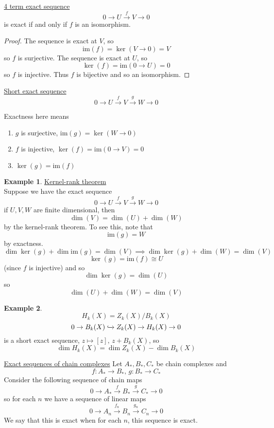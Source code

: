 \documentclass[a4paper,14pt]{extarticle}
\theoremstyle{definition}
\newtheorem*{eg}{Example}
\begin{document}
\noindent\underline{4 term exact sequence}
\[0\rightarrow U \xrightarrow{f} V\rightarrow 0\]
is exact if and only if $f$ is an isomorphism.

\begin{proof}
	The sequence is exact at $V$, so \[\text{im}(f)=\ker(V\rightarrow 0)=V\]
	so $f$ is surjective. The sequence is exact at $U$, so
	\[\ker(f)=\text{im}(0\rightarrow U)=0\] so $f$ is injective. Thus $f$ is bijective
	and so an isomorphism.
\end{proof}

\noindent\underline{Short exact sequence}
\[0\rightarrow U\xrightarrow{f} V\xrightarrow{g} W\rightarrow 0\]

Exactness here means
\begin{enumerate}
	\item $g$ is surjective, $\text{im}(g)=\ker(W\rightarrow 0)$
	\item $f$ is injective, $\ker(f)=\text{im}(0\rightarrow V)=0$
	\item $\ker(g)=\text{im}(f)$
\end{enumerate}

\begin{eg}
\underline{Kernel-rank theorem} \\
Suppose we have the exact sequence
\[0\rightarrow U\xrightarrow{f} V\xrightarrow{g} W\rightarrow 0\]
if $U,V,W$ are finite dimensional, then \[\dim(V)=\dim(U)+\dim(W)\] by the kernel-rank theorem.
To see this, note that \[\text{im}(g)=W\] by exactness.
\[\dim\ker(g)+\dim\text{im}(g)=\dim(V)\implies\dim\ker(g)+\dim(W)=\dim(V)\] \[\ker(g)=\text{im}(f)\cong U\] (since
$f$ is injective) and so 
\[\dim\ker(g)=\dim(U)\] so \[\dim(U)+\dim(W)=\dim(V)\]
\end{eg}

\begin{eg}
\[H_k(X)=Z_k(X)/B_k(X)\]
\[0\rightarrow B_k(X)\xhookrightarrow{} Z_k(X)\rightarrow H_k(X)\rightarrow 0\]
is a short exact sequence, $z\mapsto[z], \,z+B_k(X)$, so 
\[\dim H_k(X)=\dim Z_k(X) - \dim B_k(X)\]
\end{eg}

\noindent\underline{Exact sequences of chain complexes}
Let $A_*,B_*,C_*$ be chain complexes and
\[f:A_*\rightarrow B_*, \,g:B_*\rightarrow C_*\]
Consider the following sequence of chain maps
\[0\rightarrow A_*\xrightarrow{f} B_*\xrightarrow{g} C_*\rightarrow 0\]
so for each $n$ we have a sequence of linear maps
\[0\rightarrow A_n\xrightarrow{f_n} B_n\xrightarrow{g_n} C_n\rightarrow 0\]
We say that this is exact when for each $n$, this sequence is exact.
\end{document}
